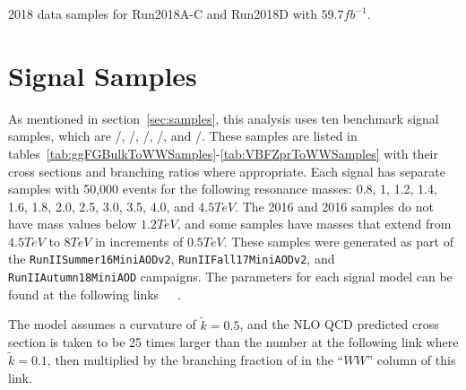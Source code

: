 \begin{table}[htbp]
  \centering
  
  \caption{
    2018 data samples for Run2018A-C and Run2018D with $59.7\unit{fb^{-1}}$.
  }
  \label{tab:dataSamples2018}
\end{table}

\section{Signal Samples}
\label{sec:sigSamples}

As mentioned in section~\ref{sec:samples}, this analysis uses ten benchmark signal samples, which are \ggF/\VBF\GBulktoWWtolnuqqbarpr, \ggF/\VBF\RadtoWWtolnuqqbarpr, \DY/\VBF\WprtoWZtolnuqqbar, \DY/\VBF\WprtoWHtolnubbbar, and \DY/\VBF\ZprtoWWtolnuqqbarpr.
These samples are listed in tables~\ref{tab:ggFGBulkToWWSamples}-\ref{tab:VBFZprToWWSamples} with their cross sections and branching ratios where appropriate.
Each signal has separate samples with 50,000 events for the following resonance masses: 0.8, 1, 1.2, 1.4, 1.6, 1.8, 2.0, 2.5, 3.0, 3.5, 4.0, and $4.5\unit{TeV}$.
The 2016 \VBF\ZprtoWW and 2016 \VBF\WprtoWZ samples do not have mass values below $1.2\unit{TeV}$, and some samples have masses that extend from $4.5\unit{TeV}$ to $8\unit{TeV}$ in increments of $0.5\unit{TeV}$.
These samples were generated as part of the \texttt{RunIISummer16MiniAODv2}, \texttt{RunIIFall17MiniAODv2}, and \texttt{RunIIAutumn18MiniAOD} campaigns.
The parameters for each signal model can be found at the following links\footnotemark~\footnotemark~\footnotemark~\footnotemark.
\addtocounter{footnote}{-4}

The \ggF\GBulktoWW model assumes a curvature of $\tilde{k}=0.5$, and the NLO QCD predicted cross section is taken to be 25 times larger than the number at the following link\footnotemark{} where $\tilde{k}=0.1$, then multiplied by the branching fraction of \GBulktoWW in the ``$WW$'' column of this link\footnotemark.
\addtocounter{footnote}{-2}

